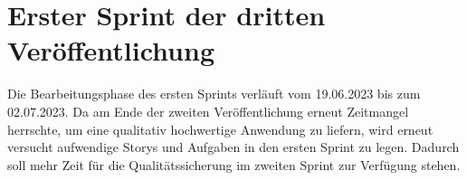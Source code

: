 \section{Erster Sprint der dritten Veröffentlichung}
Die Bearbeitungsphase des ersten Sprints verläuft vom 19.06.2023 bis zum 02.07.2023.
Da am Ende der zweiten Veröffentlichung erneut Zeitmangel herrschte, um eine qualitativ hochwertige Anwendung zu liefern, wird erneut versucht aufwendige Storys und Aufgaben in den ersten Sprint zu legen. Dadurch soll mehr Zeit für die Qualitätssicherung im zweiten Sprint zur Verfügung stehen.



